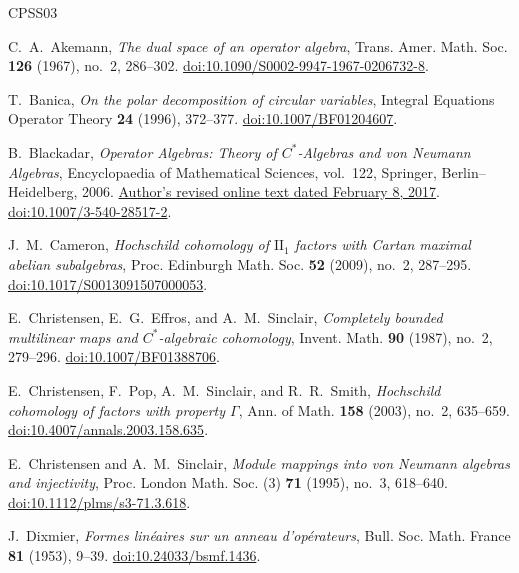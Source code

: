 \begin{thebibliography}{CPSS03}
\raggedright

C.~A.~Akemann,
\emph{The dual space of an operator algebra},
Trans. Amer. Math. Soc. \textbf{126} (1967), no.~2, 286--302.
\href{https://doi.org/10.1090/S0002-9947-1967-0206732-8}{doi:10.1090/S0002-9947-1967-0206732-8}.

T.~Banica,
\emph{On the polar decomposition of circular variables},
Integral Equations Operator Theory \textbf{24} (1996), 372--377.
\href{https://doi.org/10.1007/BF01204607}{doi:10.1007/BF01204607}.

B.~Blackadar,
\emph{Operator Algebras: Theory of $C^*$-Algebras and von Neumann Algebras},
Encyclopaedia of Mathematical Sciences, vol.~122,
Springer, Berlin--Heidelberg, 2006.
\href{https://bruceblackadar.com/Mathematics/Cycr.pdf}{Author's revised
online text dated February 8, 2017}.
\href{https://doi.org/10.1007/3-540-28517-2}{doi:10.1007/3-540-28517-2}.

J.~M.~Cameron,
\emph{Hochschild cohomology of $\mathrm{II}_1$ factors with Cartan
maximal abelian subalgebras},
Proc. Edinburgh Math. Soc. \textbf{52} (2009), no.~2, 287--295.
\href{https://doi.org/10.1017/S0013091507000053}{doi:10.1017/S0013091507000053}.

E.~Christensen, E.~G.~Effros, and A.~M.~Sinclair,
\emph{Completely bounded multilinear maps and $C^*$-algebraic cohomology},
Invent. Math. \textbf{90} (1987), no.~2, 279--296.
\href{https://doi.org/10.1007/BF01388706}{doi:10.1007/BF01388706}.

E.~Christensen, F.~Pop, A.~M.~Sinclair, and R.~R.~Smith,
\emph{Hochschild cohomology of factors with property $\Gamma$},
Ann. of Math. \textbf{158} (2003), no.~2, 635--659.
\href{https://doi.org/10.4007/annals.2003.158.635}{doi:10.4007/annals.2003.158.635}.

E.~Christensen and A.~M.~Sinclair,
\emph{Module mappings into von Neumann algebras and injectivity},
Proc. London Math. Soc. (3) \textbf{71} (1995), no.~3, 618--640.
\href{https://doi.org/10.1112/plms/s3-71.3.618}{doi:10.1112/plms/s3-71.3.618}.

J.~Dixmier,
\emph{Formes lin\'eaires sur un anneau d'op\'erateurs},
Bull. Soc. Math. France \textbf{81} (1953), 9--39.
\href{https://doi.org/10.24033/bsmf.1436}{doi:10.24033/bsmf.1436}.


\end{thebibliography}
